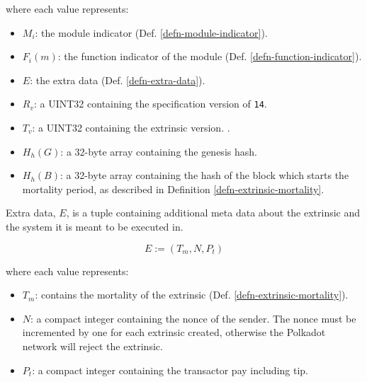 \begin{definition}
    where each value represents:
    \begin{itemize}
        \item $M_i$: the module indicator (Def. \ref{defn-module-indicator}).
        \item $F_i(m)$: the function indicator of the module
        (Def. \ref{defn-function-indicator}).
        \item $E$: the extra data (Def. \ref{defn-extra-data}).
        \item $R_v$: a UINT32 containing the specification version of \verb|14|.
        \item $T_v$: a UINT32 containing the extrinsic version.
        .
        \item $H_h(G)$: a 32-byte array containing the genesis hash.
        \item $H_h(B)$: a 32-byte array containing the hash of the block which
        starts the mortality period, as described in Definition
        \ref{defn-extrinsic-mortality}.
    \end{itemize}
\end{definition}

\begin{definition}
    \label{defn-extra-data}
    Extra data, $E$, is a tuple containing additional meta data about the
    extrinsic and the system it is meant to be executed in.

    \[
        E := (T_m, N, P_t)
    \]

    where each value represents:
    \begin{itemize}
        \item $T_m$: contains the mortality of the extrinsic (Def. \ref{defn-extrinsic-mortality}).
        \item $N$: a compact integer containing the nonce of the sender. The
        nonce must be incremented by one for each extrinsic created, otherwise
        the Polkadot network will reject the extrinsic.
        \item $P_t$: a compact integer containing the transactor pay including tip.
    \end{itemize}

\end{definition}

